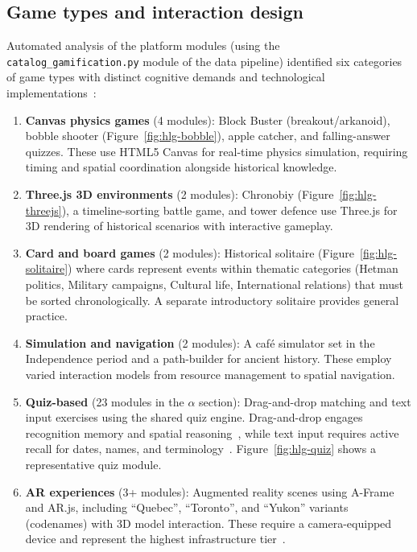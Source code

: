 \subsection{Game types and interaction design}

Automated analysis of the platform modules (using the \texttt{catalog\_gamification.py} module of the data pipeline) identified six categories of game types with distinct cognitive demands and technological implementations~\cite{Prensky2001, Clark2016, Knutas2016}:

\begin{enumerate}
\item \textbf{Canvas physics games} (4 modules): Block Buster (breakout/arkanoid), bobble shooter (Figure~\ref{fig:hlg-bobble}), apple catcher, and falling-answer quizzes. These use HTML5 Canvas for real-time physics simulation, requiring timing and spatial coordination alongside historical knowledge.
\item \textbf{Three.js 3D environments} (2 modules): Chronobiy (Figure~\ref{fig:hlg-threejs}), a timeline-sorting battle game, and tower defence use Three.js for 3D rendering of historical scenarios with interactive gameplay.
\item \textbf{Card and board games} (2 modules): Historical solitaire (Figure~\ref{fig:hlg-solitaire}) where cards represent events within thematic categories (Hetman politics, Military campaigns, Cultural life, International relations) that must be sorted chronologically. A separate introductory solitaire provides general practice.
\item \textbf{Simulation and navigation} (2 modules): A caf\'{e} simulator set in the Independence period and a path-builder for ancient history. These employ varied interaction models from resource management to spatial navigation.
\item \textbf{Quiz-based} (23 modules in the $\alpha$ section): Drag-and-drop matching and text input exercises using the shared quiz engine. Drag-and-drop engages recognition memory and spatial reasoning~\cite{Bonwell1991, Qian2016, Lampropoulos2024}, while text input requires active recall for dates, names, and terminology~\cite{Connolly2012, Clark2016}. Figure~\ref{fig:hlg-quiz} shows a representative quiz module.
\item \textbf{AR experiences} (3+ modules): Augmented reality scenes using A-Frame and AR.js, including ``Quebec'', ``Toronto'', and ``Yukon'' variants (codenames) with 3D model interaction. These require a camera-equipped device and represent the highest infrastructure tier~\cite{1Barbatsis201159}.
\end{enumerate}

